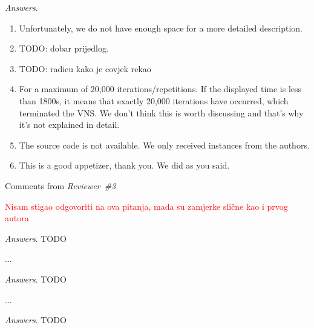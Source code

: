 \documentclass [11pt]{scrartcl}
\begin{document}
\emph{Answers}. 
\begin{enumerate}
	
\item Unfortunately, we do not have enough space for a more detailed description.
\item TODO: dobar prijedlog.
\item TODO: radicu kako je covjek rekao
\item For a maximum of 20,000 iterations/repetitions. If the displayed time is less than 1800s, it means that exactly 20,000 iterations have occurred, which terminated the VNS. We don't think this is worth discussing and that's why it's not explained in detail.
\item The source code is not available. We only received instances from the authors.
\item This is a good appetizer, thank you. We did as you said. 
 
\end{enumerate}

\begin{center} Comments from \textit{Reviewer\ \#3}
	
\end{center}


\begin{leftbar}
 \textcolor{red}{Nisam stigao odgovoriti na ova pitanja, mada su zamjerke slične kao i prvog autora}

	
\end{leftbar}

\emph{Answers}. TODO 


\begin{leftbar}
...
	
\end{leftbar}

\emph{Answers}. TODO 


\begin{leftbar}
...
	
\end{leftbar}

\emph{Answers}. TODO 
 






\end{document}
